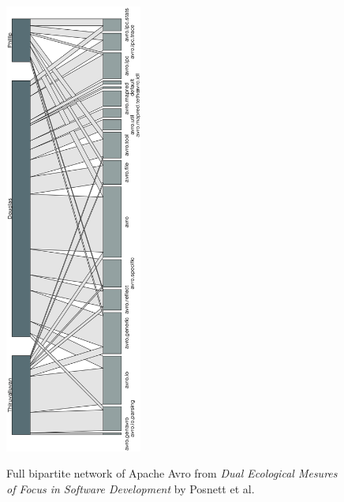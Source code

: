 \begin{figure}[H]
\centering
\includegraphics[width=0.4\textwidth]{./resources/annex_focus.png}~
\caption{Full bipartite network of Apache Avro from \emph{Dual Ecological Mesures of Focus in Software Development}\cite{Posnett} by Posnett et al.}
\label{fig:annex_bipartite_network_focus}
\end{figure}

